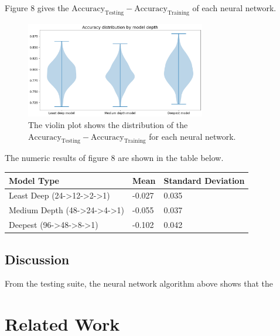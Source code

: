 \documentclass[12pt]{article}
\begin{document}
Figure 8 gives the $\text{Accuracy}_{\text{Testing}} - \text{Accuracy}_{\text{Training}}$ of each neural network. 
\begin{figure}[H]
\centering
\includegraphics[width=0.7\textwidth]{testOut128}
\caption{The violin plot shows the distribution of the $\text{Accuracy}_{\text{Testing}} - \text{Accuracy}_{\text{Training}}$
for each neural network. }
\end{figure}

The numeric results of figure 8 are shown in the table below.

\begin{table}[H]
\centering
\begin{tabular}{l|l|l}
\hline
\multicolumn{1}{|l|}{Model Type}                                   & Mean   & \multicolumn{1}{l|}{Standard Deviation} \\ \hline
Least Deep (24-\textgreater{}12-\textgreater{}2-\textgreater{}1)   & -0.027 & 0.035                                   \\
Medium Depth (48-\textgreater{}24-\textgreater{}4-\textgreater{}1) & -0.055 & 0.037                                   \\
Deepest (96-\textgreater{}48-\textgreater{}8-\textgreater{}1)      & -0.102 & 0.042                                  
\end{tabular}
\end{table}

\subsection{Discussion}

From the testing suite, the neural network algorithm above shows that the 

\section{Related Work}
\end{document}
